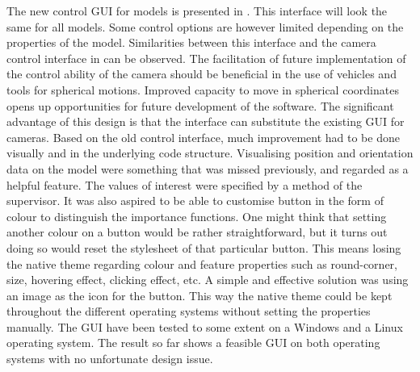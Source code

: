 The new control GUI for models is presented in . This interface will look the same for all models. Some control options are however limited depending on the properties of the model. Similarities between this interface and the camera control interface in  can be observed. The facilitation of future implementation of the control ability of the camera should be beneficial in the use of vehicles and tools for spherical motions.
Improved capacity to move in spherical coordinates opens up opportunities for future development of the software. The significant advantage of this design is that the interface can substitute the existing GUI for cameras. Based on the old control interface, much improvement had to be done visually and in the underlying code structure. Visualising position and orientation data on the model were something that was missed previously, and regarded as a helpful feature. The values of interest were specified by a method of the supervisor. It was also aspired to be able to customise button in the form of colour to distinguish the importance functions. One might think that setting another colour on a button would be rather straightforward, but it turns out doing so would reset the stylesheet of that particular button. This means losing the native theme regarding colour and feature properties such as round-corner, size, hovering effect, clicking effect, etc. A simple and effective solution was using an image as the icon for the button. This way the native theme could be kept throughout the different operating systems without setting the properties manually. The GUI have been tested to some extent on a Windows and a Linux operating system. The result so far shows a feasible GUI on both operating systems with no unfortunate design issue. 


